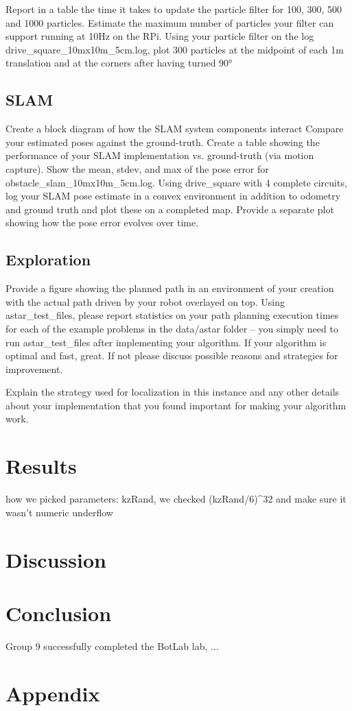 \documentclass[journal]{IEEEtran}
\begin{document}
Report in a table the time it takes to update the particle filter for 100, 300, 500 and 1000 particles.  Estimate the maximum number of particles your filter can support running at 10Hz on the RPi.
Using your particle filter on the log drive\_square\_10mx10m\_5cm.log, plot 300 particles at the midpoint of each 1m translation and at the corners after having turned 90° 

\subsection{SLAM}

Create a block diagram of how the SLAM system components interact
Compare your estimated poses against the ground-truth. Create a table showing the performance of your SLAM implementation vs. ground-truth (via motion capture). Show the mean, stdev, and max of the pose error for obstacle\_slam\_10mx10m\_5cm.log. 
Using drive\_square with 4 complete circuits, log your SLAM pose estimate in a convex environment in addition to odometry and ground truth and plot these on a completed map.
Provide a separate plot showing how the pose error evolves over time. 
\subsection{Exploration}

Provide a figure showing the planned path in an environment of your creation with the actual path driven by your robot overlayed on top. 
Using astar\_test\_files, please report statistics on your path planning execution times for each of the example problems in the data/astar folder -- you simply need to run astar\_test\_files after implementing your algorithm. If your algorithm is optimal and fast, great. If not please discuss possible reasons and strategies for improvement.

Explain the strategy used for localization in this instance and any other details about your implementation that you found important for making your algorithm work.

\section{Results}

how we picked parameters:
kzRand, we checked (kzRand/6)^32 and make sure it wasn't numeric underflow

\section{Discussion}

\section{Conclusion}

Group 9 successfully completed the BotLab lab, ...




\newpage

\section{Appendix}
\end{document}
